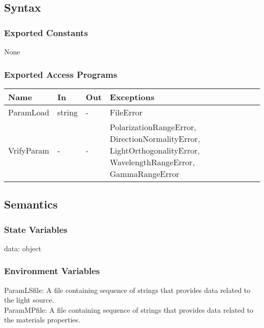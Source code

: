 \documentclass[12pt, titlepage]{article}
\begin{document}
\subsection{Syntax}

\subsubsection{Exported Constants}
None

\subsubsection{Exported Access Programs}

\begin{center}
	\begin{tabular}{p{3cm} p{2cm} p{2cm} p{8cm}}
		\hline
		\textbf{Name} & \textbf{In} & \textbf{Out} & \textbf{Exceptions} \\
		\hline
		ParamLoad & string & - & FileError\\
		VrifyParam & - & - & PolarizationRangeError, DirectionNormalityError, LightOrthogonalityError,  WavelengthRangeError, GammaRangeError\\
	
		\hline
	\end{tabular}
\end{center}

\subsection{Semantics}

\subsubsection{State Variables}

data: object

\subsubsection{Environment Variables}
ParamLSfile: A file containing sequence of strings that provides data related to the light source. \\
ParamMPfile: A file containing sequence of strings that provides data related to the materials properties.
\end{document}
